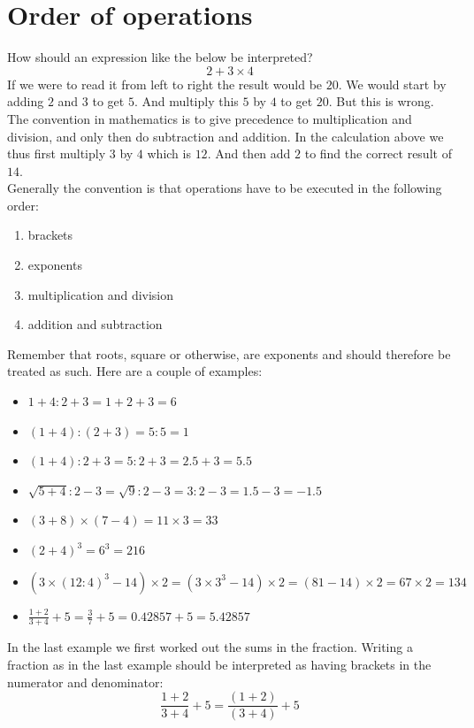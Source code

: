 \section{Order of operations}

\noindent How should an expression like the below be interpreted?
$$
2 + 3 \times 4
$$
\noindent If we were to read it from left to right the result would be $20$. We would start by adding $2$ and $3$ to get $5$. And multiply this $5$ by $4$ to get $20$. But this is wrong.\\

\noindent The convention in mathematics is to give precedence to multiplication and division, and only then do subtraction and addition. In the calculation above we thus first multiply $3$ by $4$ which is $12$. And then add $2$ to find the correct result of $14$.\\

\noindent Generally the convention is that operations have to be executed in the following order:
\begin{enumerate}
\item brackets
\item exponents 
\item multiplication and division
\item addition and subtraction
\end{enumerate}
\noindent Remember that roots, square or otherwise, are exponents and should therefore be treated as such.
\noindent Here are a couple of examples:
\begin{itemize}
\item $1 + 4 : 2 + 3 = 1 + 2 + 3 = 6$ 
\item $(1+4) : (2 + 3) = 5 : 5 = 1 $
\item $(1+4):2 + 3 = 5:2 + 3 = 2.5 + 3 = 5.5$
\item $\sqrt{5+4} : 2-3 = \sqrt{9} : 2 - 3 = 3 : 2 - 3 =  1.5 - 3 = -1.5$
\item $(3 + 8) \times (7-4) =  11 \times 3 = 33$
\item $(2+4)^3 = 6^3 = 216$
\item $(3 \times (12:4)^3 - 14) \times 2 = (3 \times 3^3 - 14) \times 2 = (81 - 14) \times 2 = 67 \times 2 = 134$
\item $\frac{1+2}{3+4} + 5 = \frac{3}{7} + 5 = 0.42857 + 5 = 5.42857$
\end{itemize}
\noindent In the last example we first worked out the sums in the fraction. Writing a fraction as in the last example should be interpreted as having brackets in the numerator and denominator:
$$
\frac{1+2}{3+4} + 5 = \frac{(1+2)}{(3+4)} + 5
$$

